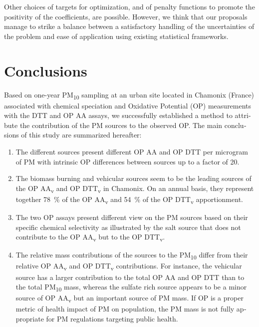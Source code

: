 \begin{otherlanguage}{english}
Other choices of targets for optimization, and of penalty functions to promote
the positivity of the coefficients, are possible. However, we think that our
proposals manage to strike a balance between a satisfactory handling of the
uncertainties of the problem and ease of application using existing statistical
frameworks.




\section{Conclusions}  %

Based on one-year PM\textsubscript{10} sampling at an urban site located in
Chamonix (France) associated with chemical speciation and Oxidative Potential
(OP) measurements with the DTT and OP AA assays, we successfully established a
method to attribute the contribution of the PM sources to the observed OP.
The main conclusions of this study are summarized hereafter:
\begin{enumerate}
    \item
        The different sources present different OP AA and OP DTT per microgram of PM
        with intrinsic OP differences between sources up to a factor of 20.
    \item
        The biomass burning and vehicular sources seem to be the leading sources of
        the OP AA\textsubscript{v} and OP DTT\textsubscript{v} in Chamonix. On an
        annual basis, they represent together 78~\% of the OP AA\textsubscript{v} and
        54~\% of the OP DTT\textsubscript{v} apportionment.
    \item
        The two OP assays present different view on the PM sources based on their
        specific chemical selectivity as illustrated by the salt source that does not
        contribute to the OP AA\textsubscript{v} but to the OP DTT\textsubscript{v}.
    \item
        The relative mass contributions of the sources to the PM\textsubscript{10}
        differ from their relative OP AA\textsubscript{v} and OP DTT\textsubscript{v}
        contributions. For instance, the vehicular source has a larger contribution to
        the total OP AA and OP DTT than to the total PM\textsubscript{10} mass,
        whereas the sulfate rich source appears to be a minor source of OP
        AA\textsubscript{v} but an important source of PM mass. If OP is a proper
        metric of health impact of PM on population, the PM mass is not fully
        appropriate for PM regulations targeting public health.
\end{enumerate}


\end{otherlanguage}
